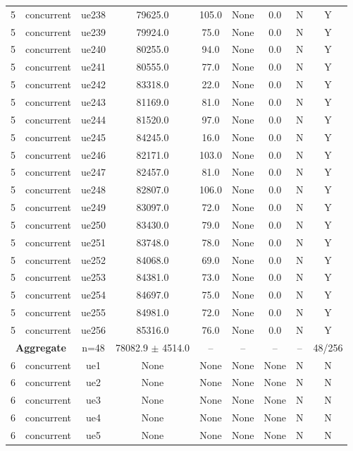 \begin{table}[ht]
\begin{tabular}{|c|c|c|c|c|c|c|c|c|}
5 & concurrent & ue238 & 79625.0 & 105.0 & None & 0.0 & N & Y \\
5 & concurrent & ue239 & 79924.0 & 75.0 & None & 0.0 & N & Y \\
5 & concurrent & ue240 & 80255.0 & 94.0 & None & 0.0 & N & Y \\
5 & concurrent & ue241 & 80555.0 & 77.0 & None & 0.0 & N & Y \\
5 & concurrent & ue242 & 83318.0 & 22.0 & None & 0.0 & N & Y \\
5 & concurrent & ue243 & 81169.0 & 81.0 & None & 0.0 & N & Y \\
5 & concurrent & ue244 & 81520.0 & 97.0 & None & 0.0 & N & Y \\
5 & concurrent & ue245 & 84245.0 & 16.0 & None & 0.0 & N & Y \\
5 & concurrent & ue246 & 82171.0 & 103.0 & None & 0.0 & N & Y \\
5 & concurrent & ue247 & 82457.0 & 81.0 & None & 0.0 & N & Y \\
5 & concurrent & ue248 & 82807.0 & 106.0 & None & 0.0 & N & Y \\
5 & concurrent & ue249 & 83097.0 & 72.0 & None & 0.0 & N & Y \\
5 & concurrent & ue250 & 83430.0 & 79.0 & None & 0.0 & N & Y \\
5 & concurrent & ue251 & 83748.0 & 78.0 & None & 0.0 & N & Y \\
5 & concurrent & ue252 & 84068.0 & 69.0 & None & 0.0 & N & Y \\
5 & concurrent & ue253 & 84381.0 & 73.0 & None & 0.0 & N & Y \\
5 & concurrent & ue254 & 84697.0 & 75.0 & None & 0.0 & N & Y \\
5 & concurrent & ue255 & 84981.0 & 72.0 & None & 0.0 & N & Y \\
5 & concurrent & ue256 & 85316.0 & 76.0 & None & 0.0 & N & Y \\
\multicolumn{2}{|c|}{\textbf{Aggregate}} & n=48 & 78082.9 $\pm$ 4514.0 & -- & -- & -- & -- & 48/256 \\
\hline
6 & concurrent & ue1 & None & None & None & None & N & N \\
6 & concurrent & ue2 & None & None & None & None & N & N \\
6 & concurrent & ue3 & None & None & None & None & N & N \\
6 & concurrent & ue4 & None & None & None & None & N & N \\
6 & concurrent & ue5 & None & None & None & None & N & N \\

\end{tabular}
\end{table}
